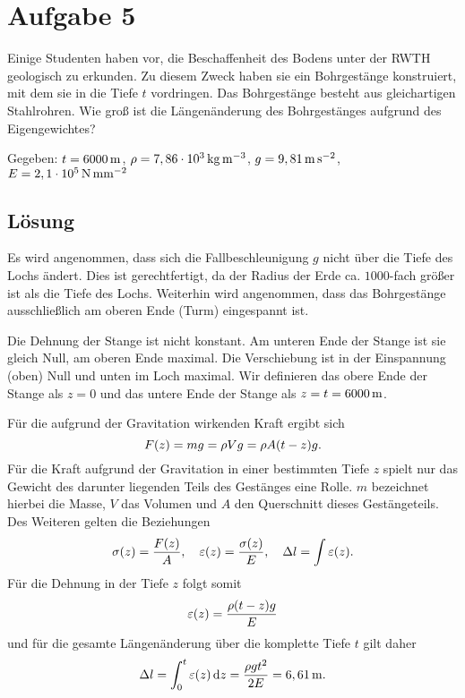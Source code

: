\documentclass{exercise}
\begin{document}
    \section*{Aufgabe 5}

    \begin{problem}
        Einige Studenten haben vor, die Beschaffenheit des Bodens unter der RWTH geologisch zu erkunden.
        Zu diesem Zweck haben sie ein Bohrgestänge konstruiert, mit dem sie in die Tiefe \(t\) vordringen.
        Das Bohrgestänge besteht aus gleichartigen Stahlrohren.
        Wie groß ist die Längenänderung des Bohrgestänges aufgrund des Eigengewichtes?

        Gegeben: \(t = 6000\,\si{\meter}\), \(\rho = 7,86 \cdot 10^3\,\si{\kilo\gram\per\meter\cubed}\), \(g = 9,81\,\si{\meter\per\second\squared}\), \(E = 2,1 \cdot 10^5\,\si{\newton\per\milli\meter\squared}\)
    \end{problem}

    \subsection*{Lösung}
    Es wird angenommen, dass sich die Fallbeschleunigung \(g\) nicht über die Tiefe des Lochs ändert.
    Dies ist gerechtfertigt, da der Radius der Erde ca. \(1000\)-fach größer ist als die Tiefe des Lochs.
    Weiterhin wird angenommen, dass das Bohrgestänge ausschließlich am oberen Ende (Turm) eingespannt ist.

    Die Dehnung der Stange ist nicht konstant.
    Am unteren Ende der Stange ist sie gleich Null, am oberen Ende maximal.
    Die Verschiebung ist in der Einspannung (oben) Null und unten im Loch maximal.
    Wir definieren das obere Ende der Stange als \(z = 0\) und das untere Ende der Stange als \(z = t = 6000\,\si{\meter}\).

    Für die aufgrund der Gravitation wirkenden Kraft ergibt sich
    \[
        F\parentheses*{z} = mg = \rho Vg = \rho A\parentheses*{t - z}g.
    \]
    Für die Kraft aufgrund der Gravitation in einer bestimmten Tiefe \(z\) spielt nur das Gewicht des darunter liegenden Teils des Gestänges eine Rolle.
    \(m\) bezeichnet hierbei die Masse, \(V\) das Volumen und \(A\) den Querschnitt dieses Gestängeteils.
    Des Weiteren gelten die Beziehungen
    \[
        \sigma\parentheses*{z} = \frac{F\parentheses*{z}}{A}, \quad \varepsilon\parentheses*{z} = \frac{\sigma\parentheses*{z}}{E}, \quad \Delta l = \int\varepsilon\parentheses*{z}.
    \]
    Für die Dehnung in der Tiefe \(z\) folgt somit
    \[
        \varepsilon\parentheses*{z} = \frac{\rho\parentheses*{t - z}g}{E}
    \]
    und für die gesamte Längenänderung über die komplette Tiefe \(t\) gilt daher
    \[
        \Delta l = \int_0^t \varepsilon\parentheses*{z}\d z = \frac{\rho gt^2}{2E} = 6,61\sis{\meter}.
    \]
\end{document}
